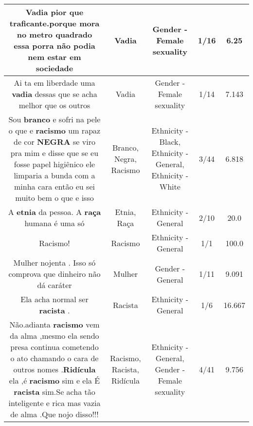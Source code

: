 \documentclass[11pt]{article}
\newlength\mylength
\begin{document}
\begin{center}
\begin{longtable}{|C{.65\mylength}|C{.30\mylength}|C{.12\mylength}|C{.12\mylength}|C{.12\mylength}|}
  \small Vadia pior que traficante.porque mora no metro quadrado essa porra não podia nem estar em sociedade\normalsize   & Vadia & Gender - Female sexuality & 1/16 & 6.25 \\  \hline
  \small Ai ta em liberdade uma \textbf{vadia} dessas que se acha melhor que os outros\normalsize   & Vadia & Gender - Female sexuality & 1/14 & 7.143 \\  \hline
  \small Sou \textbf{branco} e sofri na pele o que e \textbf{racismo} um rapaz de cor \textbf{NEGRA}   se viro pra mim e disse que se eu fosse papel higiênico  ele limparia a bunda com a minha cara então  eu sei muito bem o que e isso\normalsize   & Branco, Negra, Racismo & Ethnicity - Black, Ethnicity - General, Ethnicity - White & 3/44 & 6.818 \\  \hline
  \small A \textbf{etnia} da pessoa. A \textbf{raça}  humana é  uma só\normalsize   & Etnia, Raça & Ethnicity - General & 2/10 & 20.0 \\  \hline
  \small Racismo!\normalsize   & Racismo & Ethnicity - General & 1/1 & 100.0 \\  \hline
  \small Mulher nojenta . Isso só comprova que dinheiro não dá caráter\normalsize   & Mulher & Gender - General & 1/11 & 9.091 \\  \hline
  \small Ela acha normal ser \textbf{racista} .\normalsize   & Racista & Ethnicity - General & 1/6 & 16.667 \\  \hline
  \small Não.adianta  \textbf{racismo} vem da alma ,mesmo ela sendo presa continua cometendo o ato chamando o cara de outros nomes  .\textbf{Ridícula} ela ,é \textbf{racismo} sim e ela É \textbf{racista} sim.Se acha tão inteligente e rica mas vazia de alma .Que nojo disso!!!\normalsize   & Racismo, Racista, Ridícula & Ethnicity - General, Gender - Female sexuality & 4/41 & 9.756 \\  \hline

\end{longtable}
\end{center}
\end{document}
